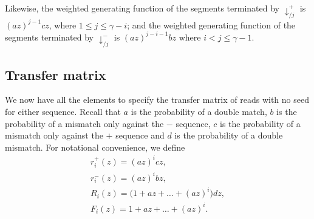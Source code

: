 \documentclass{article}
\begin{document}
Likewise, the weighted generating function of the segments terminated by
$\downarrow_{/j}^+$ is $(az)^{j-1}cz$, where $1 \leq j \leq \gamma-i$; and
the weighted generating function of the segments terminated by
$\downarrow_{/j}^-$ is $(az)^{j-i-1}bz$ where $i < j \leq \gamma-1$.

\subsection{Transfer matrix}
\label{sec_transmat_skip}

We now have all the elements to specify the transfer matrix of reads with
no seed for either sequence. Recall that $a$ is the probability of a
double match, $b$ is the probability of a mismatch only against the $-$
sequence, $c$ is the probability of a mismatch only against the $+$
sequence and $d$ is the probability of a double mismatch. For notational
convenience, we define
\begin{equation}
\begin{gathered}
r_i^+(z) = (az)^i cz, \\
r_i^-(z) = (az)^i bz, \\
R_i(z) = \big( 1 + az + \ldots + (az)^i \big) dz, \\
F_i(z) = 1 + az + \ldots + (az)^i.
\end{gathered}
\end{equation}
\end{document}
